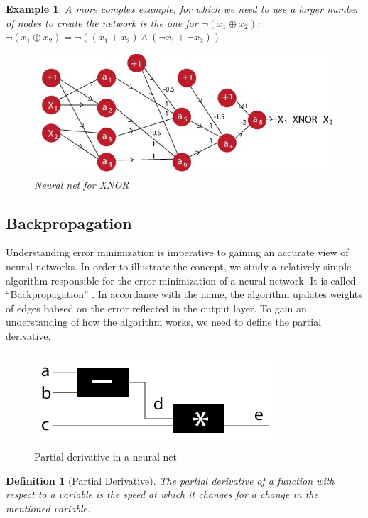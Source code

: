 \documentclass{article}
\newtheorem{definition}{Definition}[section]
\newtheorem{example}{Example}[section]
\begin{document}
\begin{example}
A more complex example, for which we need to use a larger number of nodes to create the network is the one for $\neg (x_1 \oplus x_2)$:\\
$\neg (x_1 \oplus x_2) = \neg((x_1+x_2) \land (\neg x_1 + \neg x_2))$

\begin{figure}[H]
	\includegraphics[scale=0.5]{xnor_s}
	\caption{Neural net for XNOR \cite{Deep_Learning}}
\end{figure}

\end{example}

\subsection{Backpropagation}
Understanding error minimization is imperative to gaining an accurate view of neural networks. In order to illustrate the concept, we study a relatively simple algorithm responsible for the error minimization of a neural network. It is called ``Backpropagation'' \cite{Deep_Learning}. In accordance with the name, the algorithm updates weights of edges babsed on the error reflected in the output layer. To gain an understanding of how the algorithm works, we need to define the partial derivative.

\begin{figure}[H]
	\includegraphics[scale=0.5]{gradient_diagram}
	\caption{Partial derivative in a neural net \cite{Deep_Learning}}
\end{figure}

\begin{definition}[Partial Derivative]
The partial derivative of a function with respect to a variable is the speed at which it changes for a change in the mentioned variable. \cite{Deep_Learning}\\
\end{definition}
\end{document}
